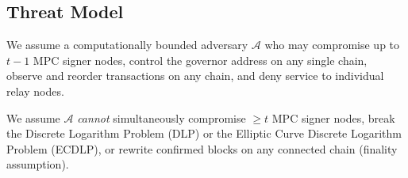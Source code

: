 \subsection{Threat Model}

We assume a computationally bounded adversary $\mathcal{A}$ who may compromise up to $t - 1$ MPC signer nodes, control the governor address on any single chain, observe and reorder transactions on any chain, and deny service to individual relay nodes.

We assume $\mathcal{A}$ \emph{cannot} simultaneously compromise $\geq t$ MPC signer nodes, break the Discrete Logarithm Problem (DLP) or the Elliptic Curve Discrete Logarithm Problem (ECDLP), or rewrite confirmed blocks on any connected chain (finality assumption).

